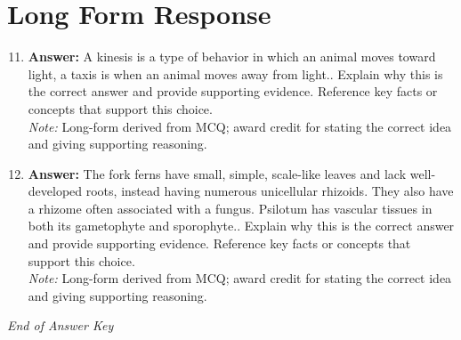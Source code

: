 \documentclass[12pt]{article}
\begin{document}
\section*{Long Form Response}
\begin{enumerate}[label=\arabic*.]
\setcounter{enumi}{10}
\item \textbf{Answer:} A kinesis is a type of behavior in which an animal moves toward light, a taxis is when an animal moves away from light.. Explain why this is the correct answer and provide supporting evidence. Reference key facts or concepts that support this choice.
\\ \textit{Note:} Long-form derived from MCQ; award credit for stating the correct idea and giving supporting reasoning.
\item \textbf{Answer:} The fork ferns have small, simple, scale-like leaves and lack well-developed roots, instead having numerous unicellular rhizoids. They also have a rhizome often associated with a fungus. Psilotum has vascular tissues in both its gametophyte and sporophyte.. Explain why this is the correct answer and provide supporting evidence. Reference key facts or concepts that support this choice.
\\ \textit{Note:} Long-form derived from MCQ; award credit for stating the correct idea and giving supporting reasoning.
\end{enumerate}

\vfill
\noindent\textit{End of Answer Key}
\end{document}
